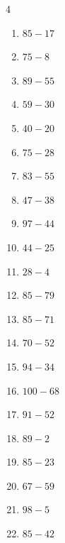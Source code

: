 \begin{multicols}{4}
\begin{enumerate}
  \item $85-17$
        \phantom{$=68$}

  \item $75-8$
        \phantom{$=67$}

  \item $89-55$
        \phantom{$=34$}

  \item $59-30$
        \phantom{$=29$}

  \item $40-20$
        \phantom{$=20$}

  \item $75-28$
        \phantom{$=47$}

  \item $83-55$
        \phantom{$=28$}

  \item $47-38$
        \phantom{$=9$}

  \item $97-44$
        \phantom{$=53$}

  \item $44-25$
        \phantom{$=19$}

  \item $28-4$
        \phantom{$=24$}

  \item $85-79$
        \phantom{$=6$}

  \item $85-71$
        \phantom{$=14$}

  \item $70-52$
        \phantom{$=18$}

  \item $94-34$
        \phantom{$=60$}

  \item $100-68$
        \phantom{$=32$}

  \item $91-52$
        \phantom{$=39$}

  \item $89-2$
        \phantom{$=87$}

  \item $85-23$
        \phantom{$=62$}

\columnbreak %

  \item $67-59$
        \phantom{$=8$}

  \item $98-5$
        \phantom{$=93$}

  \item $85-42$
        \phantom{$=43$}


\end{enumerate}
\end{multicols}
